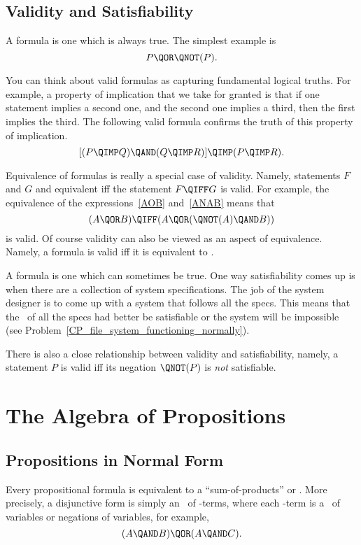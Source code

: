 \subsection{Validity and Satisfiability}
A  formula is one which is always true.  The simplest example is
\[
P \QOR \QNOT(P).
\]

You can think about valid formulas as capturing fundamental logical
truths.  For example, a property of implication that we take for
granted is that if one statement implies a second one, and the second
one implies a third, then the first implies the third.  The following
valid formula confirms the truth of this property of implication.
\[
[(P \QIMP Q) \QAND (Q \QIMP R)] \QIMP (P \QIMP R).
\]

Equivalence of formulas is really a special case of validity.  Namely,
statements $F$ and $G$ and equivalent iff the statement $F \QIFF G$ is
valid.  For example, the equivalence of the expressions~\ref{AOB}
and~\ref{ANAB} means that
\[
(A \QOR B) \QIFF (A \QOR (\QNOT(A) \QAND B))
\]
is valid.  Of course validity can also be viewed as an aspect of
equivalence.  Namely, a formula is valid iff it is equivalent
to \true.

A  formula is one which can sometimes be true.  One
way satisfiability comes up is when there are a collection of system
specifications.  The job of the system designer is to come up with a
system that follows all the specs.  This means that the \QAND\ of all
the specs had better be satisfiable or the system will be impossible
(see Problem~\ref{CP_file_system_functioning_normally}).

There is also a close relationship between validity and
satisfiability, namely, a statement $P$ is valid iff its negation
$\QNOT(P)$ is \emph{not} satisfiable.

\begin{problems}

\classproblems
{}
\end{problems}


\section{The Algebra of Propositions}

\subsection{Propositions in Normal Form}
Every propositional formula is equivalent to a ``sum-of-products''
or .  More precisely, a disjunctive form is
simply an \QOR\ of \QAND-terms, where each \QAND-term is a \QAND\ of
variables or negations of variables, for example, 
\begin{equation}\label{ANBOANC}
(A \QAND B) \QOR (A \QAND C).
\end{equation}

